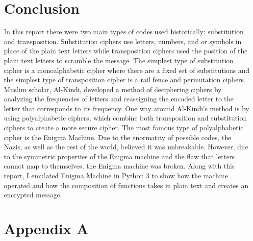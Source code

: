 \documentclass[12pt,letterpaper]{article} %
\begin{document}
\section{Conclusion}
In this report there were two main types of codes used historically: substitution and transposition. Substitution ciphers use letters, numbers, and or symbols in place of the plain text letters while transposition ciphers used the position of the plain text letters to scramble the message.  The simplest type of substitution cipher is a monoalphabetic cipher where there are a fixed set of substitutions and the simplest type of transposition cipher is a rail fence and permutation ciphers.  Muslim scholar, Al-Kindi, developed a method of deciphering ciphers by analyzing the frequencies of letters and reassigning the encoded letter to the letter that corresponds to its frequency. One way around Al-Kindi's method is by using polyalphabetic ciphers, which combine both transposition and substitution ciphers to create a more secure cipher. The most famous type of polyalphabetic cipher is the Enigma Machine. Due to the enormatity of possible codes, the Nazis, as well as the rest of the world, believed it was unbreakable.  However, due to the symmetric properties of the Enigma machine and the flaw that letters cannot map to themselves, the Enigma machine was broken. Along with this report, I emulated Enigma Machine in Python 3 to show how the machine operated and how the composition of functions takes in plain text and creates an encrypted message. 

\newpage
\section{Appendix  A}
\end{document}
